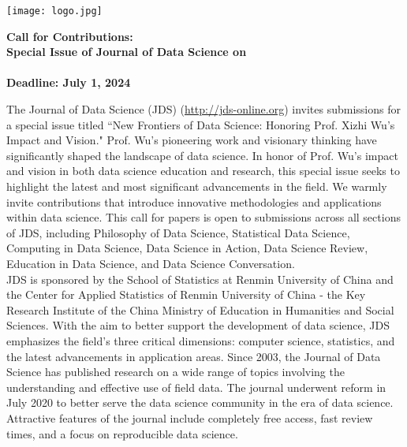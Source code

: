 \documentclass[12pt]{article}
\begin{document}
\pagestyle{empty}


\noindent
\begin{minipage}[m]{1.74in}
\texttt{[image: logo.jpg]}
\end{minipage}
\hfill
\begin{minipage}[m]{5in}
\begin{center}
  {\color{dukeblue}
    {\bf\LARGE Call for Contributions:}}\\[1ex]
  {\bf\large Special Issue of Journal of Data Science on}\\[1ex]
  {\color{dukeblue}{\bf\large  New Frontiers of Data Science: \\ Honoring Prof. Xizhi Wu's Impact and Vision}\\[1ex]
  {\bf Deadline: July 1, 2024}}
\end{center}
\end{minipage}

\bigskip
\bigskip
The Journal of Data Science (JDS) (\url{http://jds-online.org}) invites submissions for a special issue titled ``New Frontiers of Data Science: Honoring Prof. Xizhi Wu's Impact and Vision." Prof. Wu's pioneering work and visionary thinking have significantly shaped the landscape of data science. In honor of Prof. Wu's impact and vision in both data science education and research, this special issue seeks to highlight the latest and most significant advancements in the field. We warmly invite contributions that introduce innovative methodologies and applications within data science. This call for papers is open to submissions across all sections of JDS, including Philosophy of Data Science, Statistical Data Science, Computing in Data Science, Data Science in Action, Data Science Review, Education in Data Science, and Data Science Conversation. 
\\

JDS is sponsored by the School of Statistics at Renmin University of China and the Center for Applied Statistics of Renmin University of China - the Key Research Institute of the China Ministry of Education in Humanities and Social Sciences. With the aim to better support the development of data science, JDS emphasizes the field's three critical dimensions: computer science, statistics, and the latest advancements in application areas. Since 2003, the Journal of Data Science has published research on a wide range of topics involving the understanding and effective use of field data. The journal underwent reform in July 2020 to better serve
the data science community in the era of data science. Attractive features of the journal include completely free access, fast review times, and a focus on reproducible data science.
\\
\end{document}
